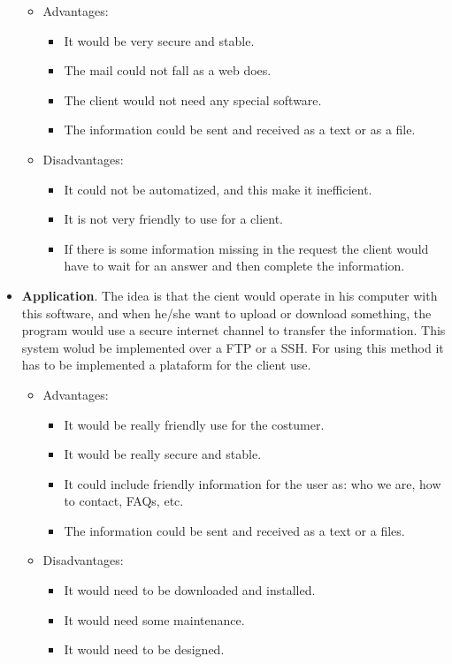 \begin{itemize}
\begin{itemize}
\item Advantages:
\begin{itemize}
\item It would be very secure and stable.
\item The mail could not fall as a web does.
\item The client would not need any special software.
\item The information could be sent and received as a text or as a file.
\end{itemize}
\item Disadvantages: 
\begin{itemize}
\item It could not be automatized, and this make it inefficient.
\item It is not very friendly to use for a client.
\item If there is some information missing in the request the client would have to wait for an answer and then complete the information. 
\end{itemize}
\end{itemize}
\item \textbf{Application}.  The idea is that the cient would operate in his computer with this software, and when he/she want to upload or download something, the program would use a secure internet channel to transfer the information. This system wolud be implemented over a FTP or a SSH. For using this method it has to be implemented a plataform for the client use.
\begin{itemize}
\item Advantages:
\begin{itemize}
\item It would be really friendly use for the costumer.
\item It would be really secure and stable.
\item It could include friendly information for the user as: who we are, how to contact, FAQs, etc.
\item The information could be sent and received as a text or a files.
\end{itemize}
\item Disadvantages:
\begin{itemize}
\item It would need to be downloaded and installed.
\item It would need some maintenance.
\item It would need to be designed.
\end{itemize}
\end{itemize}
\end{itemize}
